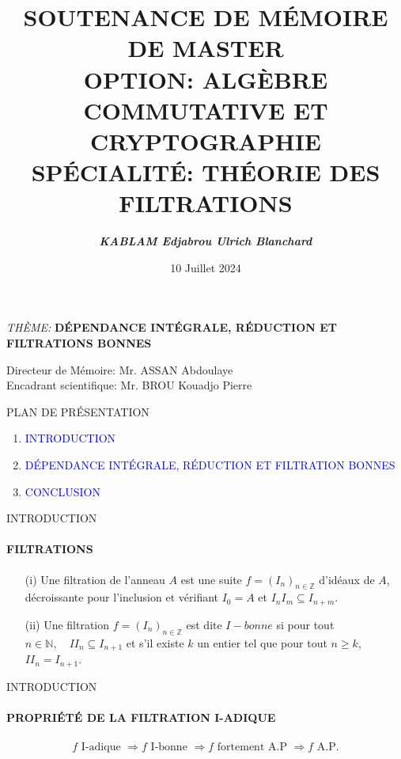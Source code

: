 \documentclass[11pt,a4paper]{beamer}
\author{\textit{\textbf{KABLAM Edjabrou Ulrich Blanchard}}}
\title{\textbf{SOUTENANCE DE MÉMOIRE DE MASTER \\ OPTION: ALGÈBRE COMMUTATIVE ET CRYPTOGRAPHIE\\ SPÉCIALITÉ: THÉORIE DES FILTRATIONS}}
\institute{\textcolor{red}{\textbf{Université NANGUI ABROGOUA \\ UFR Sciences Fondamentales Appliquées}}}
\date{10 Juillet 2024}
\begin{document}
\begin{frame}
\maketitle
\begin{block}{\begin{center}
\emph{THÈME:} \textbf{DÉPENDANCE INTÉGRALE, RÉDUCTION ET FILTRATIONS BONNES }
\end{center}}
\begin{center}
Directeur de Mémoire: Mr. ASSAN Abdoulaye \\
Encadrant scientifique: Mr. BROU Kouadjo Pierre
\end{center}
\end{block}
\end{frame}

\begin{frame}{
PLAN DE PRÉSENTATION}
\begin{enumerate}
\item \textcolor{blue}{INTRODUCTION}\\
\item \textcolor{blue}{DÉPENDANCE INTÉGRALE, RÉDUCTION ET FILTRATION BONNES }\\
\item \textcolor{blue}{CONCLUSION}\\
\end{enumerate}
\end{frame}

\begin{frame}{INTRODUCTION}
\framesubtitle{FILTRATIONS}
\begin{block}{}
	\begin{enumerate}
		\item[(i)] Une filtration de l'anneau $A$ est une suite $f=(I_n)_{n \in \mathbb{Z}}$ d'idéaux de $A$, décroissante pour l'inclusion et vérifiant $I_0 = A$ et $I_n I_m \subseteq I_{n+m}$.
		\item[(ii)] Une filtration $f=(I_n)_{n \in \mathbb{Z}}$ est dite $I-bonne$ si pour tout $n \in \mathbb{N}, \quad II_n \subseteq I_{n+1}$ et s'il existe $k$ un entier tel que pour tout $n \geqslant k$, $II_n = I_{n+1}$.	
	\end{enumerate}
\end{block}
\end{frame}

\begin{frame}{INTRODUCTION}
	\framesubtitle{PROPRIÉTÉ DE LA FILTRATION I-ADIQUE}
	\begin{block}{}
\begin{eqnarray*}
	f \text{ I-adique } \Longrightarrow  f \text{ I-bonne } \Longrightarrow  f \text{ fortement A.P } \Longrightarrow f \text{ A.P.} \\
\end{eqnarray*}
	\end{block}
\end{frame}
\end{document}

